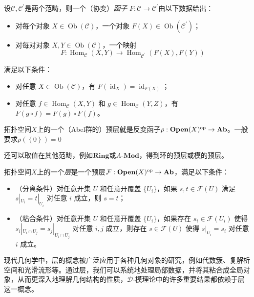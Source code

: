 \documentclass[12pt,a4paper]{ctexrep}   %
\begin{document}
\begin{definition}
    设$\mathcal{C},\mathcal{C}^\prime$是两个范畴，则一个（协变）\emph{函子} $F:\mathcal{C}\to \mathcal{C}^\prime$由以下数据给出：

    \begin{itemize}
        \item
              对每个对象 $X\in \operatorname{Ob}(\mathcal{C})$，一个对象 $F(X)\in \operatorname{Ob}(\mathcal{C}^\prime)$；
        \item
              对每对对象 $X,Y\in \operatorname{Ob}(\mathcal{C})$，一个映射
              \[
                  F:\operatorname{Hom}_{\mathcal{C}}(X,Y)\to \operatorname{Hom}_{\mathcal{C}^\prime}(F(X),F(Y))
              \]
    \end{itemize}
    满足以下条件：
    \begin{itemize}
        \item 对任意 $X\in \operatorname{Ob}(\mathcal{C})$，有 $F(\operatorname{id}_X)=\operatorname{id}_{F(X)}$；
        \item 对任意 $f\in \operatorname{Hom}_{\mathcal{C}}(X,Y)$ 和 $g\in \operatorname{Hom}_{\mathcal{C}}(Y,Z)$，有 $F(g\circ f)=F(g)\circ F(f)$。
    \end{itemize}
\end{definition}

\begin{example}
    拓扑空间$X$上的一个（Abel群的）预层就是反变函子$\rho :\mathbf{Open}(X)^{\mathrm{op}} \to \mathbf{Ab}$。一般要求$\rho(\left\{0\right\})=0$
\end{example}
\begin{remark}
    还可以取值在其他范畴，例如$\mathbf{Ring}$或$A\text{-}\mathbf{Mod}$，得到环的预层或模的预层。
\end{remark}

\begin{definition}
    拓扑空间$X$上的一个\emph{层}是一个预层$\mathcal{F}:\mathbf{Open}(X)^{\mathrm{op}}\to \mathbf{Ab}$，满足以下条件：
    \begin{itemize}
        \item
              （分离条件）对任意开集 $U$ 和任意开覆盖 $\{U_i\}$，如果 $s,t\in \mathcal{F}(U)$ 满足 $s|_{U_i}=t|_{U_i}$ 对任意 $i$ 成立，则 $s=t$；

        \item
              （粘合条件）对任意开集 $U$ 和任意开覆盖 $\{U_i\}$，如果存在 $s_i\in \mathcal{F}(U_i)$ 使得 $s_i|_{U_i\cap U_j}=s_j|_{U_i\cap U_j}$ 对任意 $i,j$ 成立，则存在 $s\in \mathcal{F}(U)$ 使得 $s|_{U_i}=s_i$ 对任意 $i$ 成立。
    \end{itemize}
\end{definition}
现代几何学中，层的概念被广泛应用于各种几何对象的研究，例如代数簇、复解析空间和光滑流形等。通过层，我们可以系统地处理局部数据，并将其粘合成全局对象，从而更深入地理解几何结构的性质，$\mathcal{D}$-模理论中的许多重要结果都依赖于层这一概念。
\end{document}
